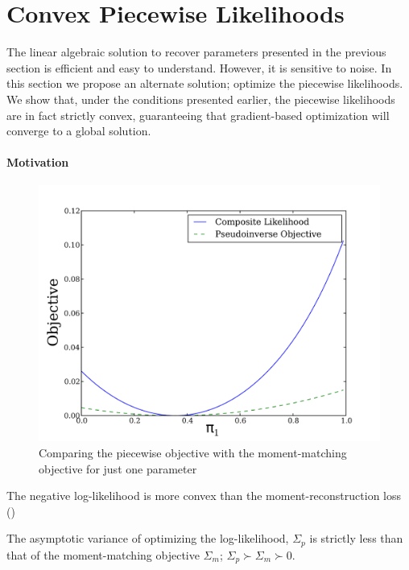 \section{Convex Piecewise Likelihoods}
\label{sec:piecewise}

The linear algebraic solution to recover parameters presented in the
  previous section is efficient and easy to understand. 
However, it is sensitive to noise. 
In this section we propose an alternate solution; optimize the piecewise
  likelihoods.
We show that, under the conditions presented earlier\reword, the
  piecewise likelihoods are in fact strictly convex, guaranteeing that
  gradient-based optimization will converge to a global solution.

\paragraph{Motivation}

\begin{figure}
  \centering
  \label{fig:piecewise-objective}
  \includegraphics[width=\columnwidth]{figures/piecewise-objective.pdf}
  \caption{Comparing the piecewise objective with the moment-matching objective for just one parameter}
\end{figure}

The negative log-likelihood is more convex than the moment-reconstruction loss ()

\begin{corollary}
  The asymptotic variance of optimizing the log-likelihood, $\Sigma_p$
  is strictly less than that of the moment-matching objective
  $\Sigma_m$; $\Sigma_p \succ \Sigma_m \succ 0$.
\end{corollary}

